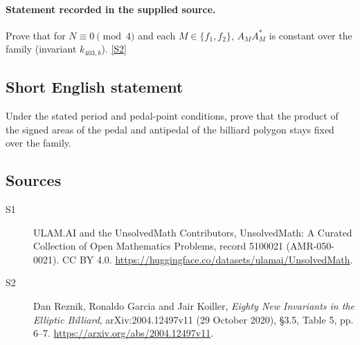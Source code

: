 \documentclass[11pt]{article}
\newcommand{\sref}[2]{\hyperlink{source:#1:#2}{[S#2]}}
\begin{document}
\paragraph{Statement recorded in the supplied source.}
Prove that for $N\equiv0\pmod4$ and each $M\in\{f_1,f_2\}$, $A_MA_M^*$ is constant over the family (invariant $k_{403,b}$). \sref{5100021}{2}
\subsection{Short English statement}
Under the stated period and pedal-point conditions, prove that the product of the signed areas of the pedal and antipedal of the billiard polygon stays fixed over the family.
\subsection{Sources}
\begin{description}
\item[\hypertarget{source:5100021:1}{S1}] ULAM.AI and the UnsolvedMath Contributors, UnsolvedMath: A Curated Collection of Open Mathematics Problems, record 5100021 (AMR-050-0021). CC BY 4.0. \url{https://huggingface.co/datasets/ulamai/UnsolvedMath}.
\item[\hypertarget{source:5100021:2}{S2}] Dan Reznik, Ronaldo Garcia and Jair Koiller, \emph{Eighty New Invariants in the Elliptic Billiard}, arXiv:2004.12497v11 (29 October 2020), \S3.5, Table 5, pp. 6--7. \url{https://arxiv.org/abs/2004.12497v11}.
\end{description}
\label{end:5100021}
\end{document}
